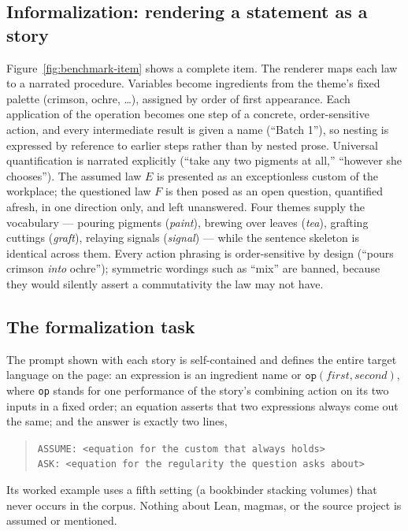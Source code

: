 \documentclass{article}
\begin{document}
\subsection{Informalization: rendering a statement as a story}
Figure~\ref{fig:benchmark-item} shows a complete item. The renderer maps
each law to a narrated procedure. Variables become ingredients from the
theme's fixed palette (crimson, ochre, \dots), assigned by order of first
appearance. Each application of the operation becomes one step of a
concrete, order-sensitive action, and every intermediate result is given a
name (``Batch 1''), so nesting is expressed by reference to earlier steps
rather than by nested prose. Universal quantification is narrated
explicitly (``take any two pigments at all,'' ``however she chooses'').
The assumed law $E$ is presented as an exceptionless custom of the
workplace; the questioned law $F$ is then posed as an open question,
quantified afresh, in one direction only, and left unanswered.
Four themes supply the vocabulary --- pouring pigments (\textit{paint}),
brewing over leaves (\textit{tea}), grafting cuttings (\textit{graft}),
relaying signals (\textit{signal}) --- while the sentence skeleton is
identical across them. Every
action phrasing is order-sensitive by design (``pours crimson \textit{into}
ochre''); symmetric wordings such as ``mix'' are banned, because they would
silently assert a commutativity the law may not have.
 
\subsection{The formalization task}
The prompt shown with each story is self-contained and defines the entire
target language on the page: an expression is an ingredient name or
$\mathtt{op}(\textit{first}, \textit{second})$, where \texttt{op} stands
for one performance of the story's combining action on its two inputs in a
fixed order; an equation asserts that two expressions always come out the
same; and the answer is exactly two lines,
\begin{quote}
\texttt{ASSUME: <equation for the custom that always holds>}\\
\texttt{ASK: <equation for the regularity the question asks about>}
\end{quote}
Its worked example uses a fifth setting (a bookbinder stacking volumes) that
never occurs in the corpus. Nothing about Lean, magmas, or the source
project is assumed or mentioned.
\end{document}
